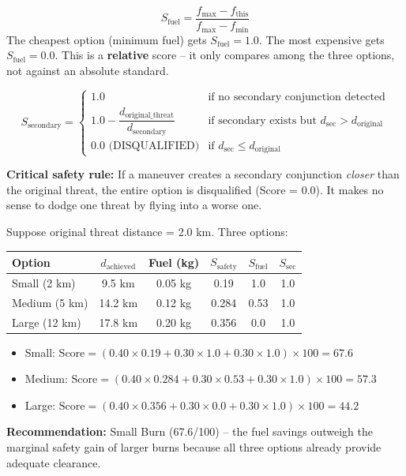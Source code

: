 \documentclass[12pt,a4paper]{article}
\begin{document}
\begin{formulabox}[title=Formula: Fuel Efficiency Score]
\[
S_{\text{fuel}} = \frac{f_{\max} - f_{\text{this}}}{f_{\max} - f_{\min}}
\]
The cheapest option (minimum fuel) gets $S_{\text{fuel}} = 1.0$. The most expensive gets $S_{\text{fuel}} = 0.0$. This is a \textbf{relative} score -- it only compares among the three options, not against an absolute standard.
\end{formulabox}

\begin{formulabox}[title=Formula: Secondary Risk Score]
\[
S_{\text{secondary}} = \begin{cases}
1.0 & \text{if no secondary conjunction detected} \\
1.0 - \dfrac{d_{\text{original\_threat}}}{d_{\text{secondary}}} & \text{if secondary exists but $d_{\text{sec}} > d_{\text{original}}$} \\
0.0 \text{ (DISQUALIFIED)} & \text{if $d_{\text{sec}} \leq d_{\text{original}}$}
\end{cases}
\]

\textbf{Critical safety rule:} If a maneuver creates a secondary conjunction \textit{closer} than the original threat, the entire option is disqualified (Score = 0.0). It makes no sense to dodge one threat by flying into a worse one.
\end{formulabox}

\begin{realdatabox}[title=Worked Example: Comparing Three Options]
Suppose original threat distance = 2.0 km. Three options:
\begin{center}
\begin{tabular}{lccccc}
\toprule
\textbf{Option} & \textbf{$d_{\text{achieved}}$} & \textbf{Fuel (kg)} & \textbf{$S_{\text{safety}}$} & \textbf{$S_{\text{fuel}}$} & \textbf{$S_{\text{sec}}$} \\
\midrule
Small (2 km) & 9.5 km & 0.05 kg & 0.19 & 1.0 & 1.0 \\
Medium (5 km) & 14.2 km & 0.12 kg & 0.284 & 0.53 & 1.0 \\
Large (12 km) & 17.8 km & 0.20 kg & 0.356 & 0.0 & 1.0 \\
\bottomrule
\end{tabular}
\end{center}
\begin{itemize}
    \item Small: $\text{Score} = (0.40 \times 0.19 + 0.30 \times 1.0 + 0.30 \times 1.0) \times 100 = \mathbf{67.6}$
    \item Medium: $\text{Score} = (0.40 \times 0.284 + 0.30 \times 0.53 + 0.30 \times 1.0) \times 100 = \mathbf{57.3}$
    \item Large: $\text{Score} = (0.40 \times 0.356 + 0.30 \times 0.0 + 0.30 \times 1.0) \times 100 = \mathbf{44.2}$
\end{itemize}
\textbf{Recommendation:} Small Burn (67.6/100) -- the fuel savings outweigh the marginal safety gain of larger burns because all three options already provide adequate clearance.
\end{realdatabox}
\end{document}

